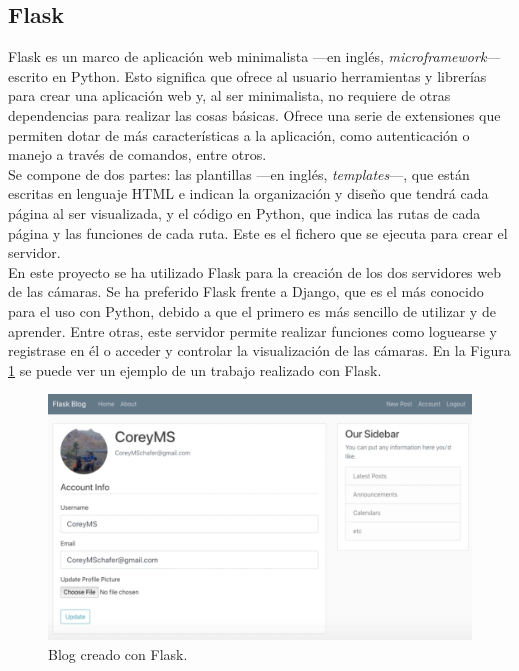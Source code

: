 \subsection{Flask}
\label{sec:flask}
Flask es un marco de aplicación web minimalista ---en inglés, \textit{microframework}--- escrito en Python. Esto significa que ofrece al usuario herramientas y librerías para crear una aplicación web y, al ser minimalista, no requiere de otras dependencias para realizar las cosas básicas. Ofrece una serie de extensiones que permiten dotar de más características a la aplicación, como autenticación o manejo a través de comandos, entre otros.\\

Se compone de dos partes: las plantillas ---en inglés, \textit{templates}---, que están escritas en lenguaje HTML e indican la organización y diseño que tendrá cada página al ser visualizada, y el código en Python, que indica las rutas de cada página y las funciones de cada ruta. Este es el fichero que se ejecuta para crear el servidor.\\

En este proyecto se ha utilizado Flask para la creación de los dos servidores web de las cámaras. Se ha preferido Flask frente a Django, que es el más conocido para el uso con Python, debido a que el primero es más sencillo de utilizar y de aprender. Entre otras, este servidor permite realizar funciones como loguearse y registrase en él o acceder y controlar la visualización de las cámaras. En la Figura \ref{fig:flask-internet} se puede ver un ejemplo de un trabajo realizado con Flask.\\
\begin{figure} [h!]
  \begin{center}
    \includegraphics[width=15cm]{figs/flask-internet}
  \end{center}
  \caption{Blog creado con Flask.}
  \label{fig:flask-internet}
\end{figure}

